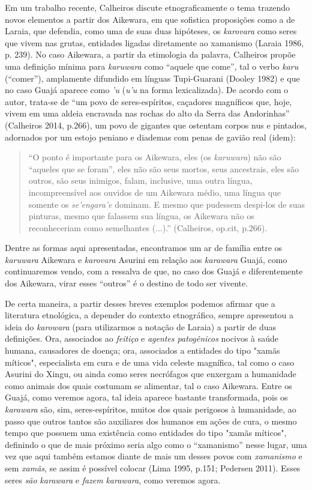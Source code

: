 Em um trabalho recente, Calheiros discute etnograficamente o tema
trazendo novos elementos a partir dos Aikewara, em que sofistica
proposições como a de Laraia, que defendia, como uma de suas duas
hipóteses, os \emph{karovara} como seres que vivem nas grutas, entidades
ligadas diretamente ao xamanismo (Laraia 1986, p. 239). No caso
Aikewara, a partir da etimologia da palavra, Calheiros propõe uma
definição mínima para \emph{karuwara} como ``aquele que come'', tal o
verbo \emph{karu} (``comer''), amplamente difundido em línguas
Tupi-Guarani (Dooley 1982) e que no caso Guajá aparece como \emph{'u}
(\emph{u'u} na forma lexicalizada). De acordo com o autor, trata-se de
``um povo de seres-espíritos, caçadores magníficos que, hoje, vivem em
uma aldeia encravada nas rochas do alto da Serra das Andorinhas''
(Calheiros 2014, p.266), um povo de gigantes que ostentam corpos nus e
pintados, adornados por um estojo peniano e diademas com penas de gavião
real (idem):

\begin{quote}
``O ponto é importante para os Aikewara, eles (os \emph{karuwara}) não
são ``aqueles que se foram'', eles não são seus mortos, seus ancestrais,
eles são outros, são seus inimigos, falam, inclusive, uma outra língua,
incompreensível aos ouvidos de um Aikewara médio, uma língua que somente
os \emph{se'engara'e} dominam. E mesmo que pudessem despi-los de suas
pinturas, mesmo que falassem sua língua, os Aikewara não os
reconheceriam como semelhantes (...).'' (Calheiros, op.cit, p.266).
\end{quote}

Dentre as formas aqui apresentadas, encontramos um ar de família entre
os \emph{karuwara} Aikewara e \emph{karovara} Asurini em relação aos
\emph{karawara} Guajá, como continuaremos vendo, com a ressalva de que,
no caso dos Guajá e diferentemente dos Aikewara, virar esses ``outros''
é o destino de todo ser vivente.

De certa maneira, a partir desses breves exemplos podemos afirmar que a
literatura etnológica, a depender do contexto etnográfico, sempre
apresentou a ideia do \emph{karowara} (para utilizarmos a notação de
Laraia) a partir de duas definições. Ora, associados ao \emph{feitiço} e
\emph{agentes patogênicos} nocivos à saúde humana, causadores de doença;
ora, associados a entidades do tipo "xamãs míticos", especialista em
cura e de uma vida celeste magnífica, tal como o caso Asurini do Xingu,
ou ainda como seres necrófagos que enxergam a humanidade como animais
dos quais costumam se alimentar, tal o caso Aikewara. Entre os Guajá,
como veremos agora, tal ideia aparece bastante transformada, pois os
\emph{karawara} são, sim, seres-espíritos, muitos dos quais perigosos à
humanidade, ao passo que outros tantos são auxiliares dos humanos em
ações de cura, o mesmo tempo que possuem uma existência como entidades
do tipo "xamãs míticos", definindo o que de mais próximo seria algo como
o ``xamanismo'' nesse lugar, uma vez que aqui também estamos diante de
mais um desses povos com \emph{xamanismo} e sem \emph{xamãs}, se assim é
possível colocar (Lima 1995, p.151; Pedersen 2011). Esses seres
\emph{são} \emph{karawara} e \emph{fazem} \emph{karawara}, como veremos
agora.

